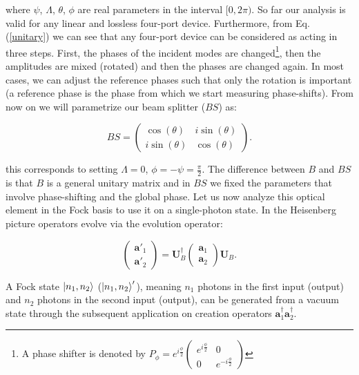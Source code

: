 \documentclass[12pt]{book}
\begin{document}
where $\psi$, $\Lambda$, $\theta$, $\phi$ are real parameters in the interval $[0,2\pi)$. So far our analysis is valid for any linear and lossless four-port device. Furthermore, from Eq. (\ref{unitary}) we can see that any four-port device can be considered as acting in three steps. First, the phases of the incident modes are changed\footnote{A phase shifter is denoted by $P_{\phi}=e^{i \frac{\phi}{2}}\begin{pmatrix}e^{i \frac{\phi}{2}} & 0 \\0 & e^{-i \frac{\phi}{2}} \end{pmatrix}$}, then the amplitudes are mixed (rotated) and then the phases are changed again. In most cases, we can adjust the reference phases such that only the rotation is important (a reference phase is the phase from which we start measuring phase-shifts). From now on we will parametrize our beam splitter ($BS$) as:

\begin{equation}
BS=\begin{pmatrix} \cos(\theta) & i \sin(\theta) \\ i \sin(\theta) & \cos(\theta) \end{pmatrix}.\label{BS_matrix}
\end{equation}


this corresponds to  setting $\Lambda=0$, $\phi=-\psi=\frac{\pi}{2}$. The difference between $B$ and $BS$ is that $B$ is a general unitary matrix and in $BS$ we fixed the parameters that involve phase-shifting and the global phase. Let us now analyze this optical element in the Fock basis  to use it on a single-photon state. In the Heisenberg picture operators evolve via the evolution operator:

\begin{equation}
\begin{pmatrix} \mathbf{a}'_{1} \\ \mathbf{a}'_{2}\end{pmatrix}=\mathbf{U}^{\dagger}_{B} \begin{pmatrix} \mathbf{a}_{1} \\ \mathbf{a}_{2}\end{pmatrix} \mathbf{U}_{B}.
\label{Heisenberg}
\end{equation}

A Fock state $\ket{n_{1},n_{2}}$ ($\ket{n_{1},n_{2}}'$), meaning $n_{1}$ photons in the first input (output) and $n_{2}$ photons in the second input (output), can be generated from a vacuum state through the subsequent application on creation operators  $\mathbf{a}^{\dagger}_{1}\mathbf{a}^{\dagger}_{2}$. 
\end{document}
